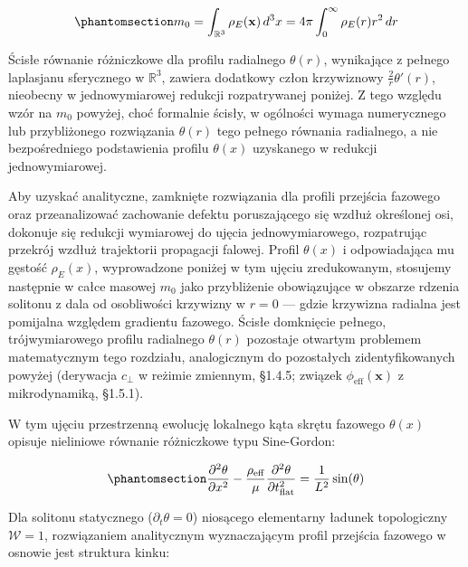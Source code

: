 \documentclass[
  polish,
  letterpaper,
  DIV=11,
  numbers=noendperiod,
  oneside]{scrartcl}
\begin{document}
\begin{equation}\protect\phantomsection\label{eq-1-6-wz4-mspocz}{m_0 = \int_{\mathbb{R}^3} \rho_{E}(\mathbf{x}) \, d^3x = 4\pi \int_{0}^{\infty} \rho_{E}(r) r^2 \, dr}\end{equation}

Ścisłe równanie różniczkowe dla profilu radialnego \(\theta(r)\),
wynikające z pełnego laplasjanu sferycznego w \(\mathbb{R}^3\), zawiera
dodatkowy człon krzywiznowy \(\frac{2}{r}\theta'(r)\), nieobecny w
jednowymiarowej redukcji rozpatrywanej poniżej. Z tego względu wzór na
\(m_0\) powyżej, choć formalnie ścisły, w ogólności wymaga numerycznego
lub przybliżonego rozwiązania \(\theta(r)\) tego pełnego równania
radialnego, a nie bezpośredniego podstawienia profilu \(\theta(x)\)
uzyskanego w redukcji jednowymiarowej.

Aby uzyskać analityczne, zamknięte rozwiązania dla profili przejścia
fazowego oraz przeanalizować zachowanie defektu poruszającego się wzdłuż
określonej osi, dokonuje się redukcji wymiarowej do ujęcia
jednowymiarowego, rozpatrując przekrój wzdłuż trajektorii propagacji
falowej. Profil \(\theta(x)\) i odpowiadająca mu gęstość \(\rho_E(x)\),
wyprowadzone poniżej w tym ujęciu zredukowanym, stosujemy następnie w
całce masowej \(m_0\) jako przybliżenie obowiązujące w obszarze rdzenia
solitonu z dala od osobliwości krzywizny w \(r=0\) --- gdzie krzywizna
radialna jest pomijalna względem gradientu fazowego. Ścisłe domknięcie
pełnego, trójwymiarowego profilu radialnego \(\theta(r)\) pozostaje
otwartym problemem matematycznym tego rozdziału, analogicznym do
pozostałych zidentyfikowanych powyżej (derywacja \(c_\perp\) w reżimie
zmiennym, §1.4.5; związek \(\phi_{\text{eff}}(\mathbf{x})\) z
mikrodynamiką, §1.5.1).

W tym ujęciu przestrzenną ewolucję lokalnego kąta skrętu fazowego
\(\theta(x)\) opisuje nieliniowe równanie różniczkowe typu Sine-Gordon:

\begin{equation}\protect\phantomsection\label{eq-1-6-wz5-kat-skret}{\frac{\partial^2 \theta}{\partial x^2} - \frac{\rho_{\text{eff}}}{\mu}\frac{\partial^2 \theta}{\partial t_{\text{flat}}^2} = \frac{1}{L^2} \sin(\theta)}\end{equation}

Dla solitonu statycznego (\(\partial_t \theta = 0\)) niosącego
elementarny ładunek topologiczny \(\mathcal{W}=1\), rozwiązaniem
analitycznym wyznaczającym profil przejścia fazowego w osnowie jest
struktura kinku:
\end{document}
